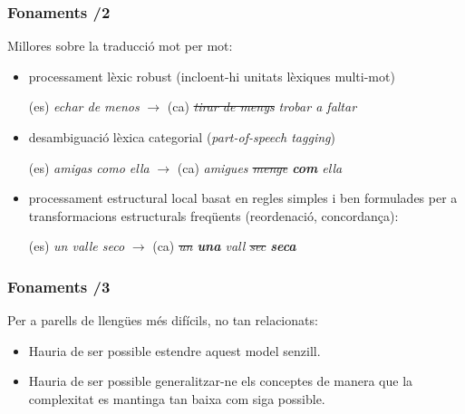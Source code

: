 \documentclass{beamer}
\newcommand{\empha}[1]{\emph{#1}\/}
\begin{document}
\begin{frame}
\frametitle{Fonaments /2}

Millores sobre la traducció mot per mot: 
\begin{itemize}
\item processament lèxic robust (incloent-hi unitats lèxiques multi-mot)
  \begin{center}
    (es) \textit{echar de menos} \(\to\) (ca) \sout{\textit{tirar de menys}} \textit{trobar a faltar}
  \end{center}
\item desambiguació lèxica categorial (\empha{part-of-speech tagging})
  \begin{center}
    (es) \textit{amigas como ella} \(\to\) (ca) \textit{amigues \sout{menge} \textbf{com} ella} 
  \end{center}
\item processament estructural local basat en regles simples i ben formulades per a transformacions estructurals freqüents (reordenació, concordança):
  \begin{center}
    (es) \textit{un valle seco} \(\to\) (ca) \textit{\sout{un} \textbf{una} vall \sout{sec} \textbf{seca}}
  \end{center}
\end{itemize}

\end{frame}

\begin{frame}
  \frametitle{Fonaments /3}
Per a parells de llengües més difícils, no tan 
relacionats: 
\begin{itemize}
\item Hauria de ser possible estendre aquest model senzill.
\item Hauria de ser possible generalitzar-ne els conceptes de manera que la complexitat es mantinga tan baixa com siga possible.
\end{itemize}
\end{frame}
\end{document}

